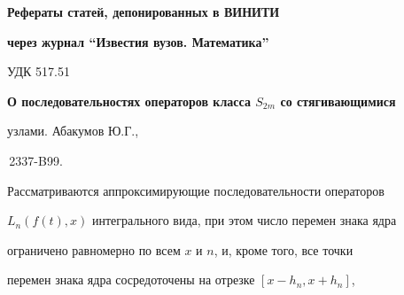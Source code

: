 

 














\setcounter{page}{84} 


\pagestyle{plain} 


 


 




\par 


{\centerline{\bf Рефераты статей, депонированных в ВИНИТИ}} 


 


{\centerline{\bf через журнал ``Известия вузов. Математика''}} 


\bigskip 


\bigskip 


{\hfill {УДК 517.51}} 


 


{\bf О последовательностях операторов класса $S_{2m}$ со стягивающимися 


узлами. Абакумов Ю.Г.,  


\No\,2337-B99.} 


\medskip 


 


Рассматриваются аппроксимирующие последовательности операторов 


$L_n(f(t),x)$ интегрального вида, при этом число перемен знака ядра


ограничено равномерно по всем $x$ и $n$, и, кроме того, все точки 


перемен знака ядра сосредоточены на отрезке $[x-h_n,x+h_n]$, 


